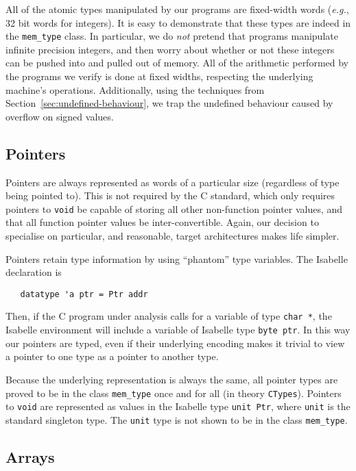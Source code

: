 \documentclass{article}
\newcommand{\eg}{\textit{e.g.}}
\begin{document}
All of the atomic types manipulated by our programs are fixed-width
words (\eg, 32 bit words for integers).  It is easy to demonstrate
that these types are indeed in the \texttt{mem_type} class.  In
particular, we do \emph{not} pretend that programs manipulate infinite
precision integers, and then worry about whether or not these integers
can be pushed into and pulled out of memory.  All of the arithmetic
performed by the programs we verify is done at fixed widths,
respecting the underlying machine's operations.
Additionally, using the techniques from Section~\ref{sec:undefined-behaviour}, we trap the undefined behaviour caused by overflow on signed values.

\subsection{Pointers}
\label{sec:pointers}

Pointers are always represented as words of a particular size
(regardless of type being pointed to).  This is not required by the C
standard, which only requires pointers to \texttt{void} be capable of
storing all other non-function pointer values, and that all function
pointer values be inter-convertible.  Again, our decision to
specialise on particular, and reasonable, target architectures makes
life simpler.

Pointers retain type information by using ``phantom'' type variables.
The Isabelle declaration is
\begin{verbatim}
   datatype 'a ptr = Ptr addr
\end{verbatim}
Then, if the C program under analysis calls for a variable of type
\texttt{char~*}, the Isabelle environment will include a variable of
Isabelle type \texttt{byte~ptr}.  In this way our pointers are typed,
even if their underlying encoding makes it trivial to view a pointer
to one type as a pointer to another type.

Because the underlying representation is always the same, all pointer
types are proved to be in the class \texttt{mem_type} once and for
all (in theory \texttt{CTypes}).  Pointers to \texttt{void} are
represented as values in the Isabelle type \texttt{unit~Ptr}, where
\texttt{unit} is the standard singleton type.  The \texttt{unit} type
is not shown to be in the class \texttt{mem_type}.

\subsection{Arrays}
\label{sec:arrays}
\end{document}
